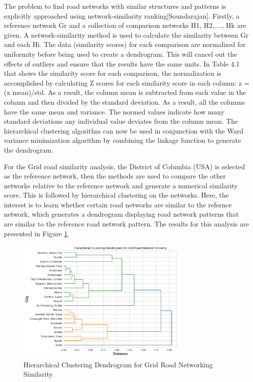 The problem to find road networks with similar structures and patterns is explicitly approached using network-similarity ranking[Soundarajan]. Firstly, a reference network Gr and a collection of comparison networks H1, H2,...., Hk are given. A network-similarity method is used to calculate the similarity between Gr and each Hi. The data (similarity scores) for each comparison are normalized for uniformity before being used to create a dendrogram. This will cancel out the effects of outliers and ensure that the results have the same units. In Table 4.1 that shows the similarity score for each comparison, the normalization is accomplished by calculating Z scores for each similarity score in each column: z = (x mean)/std. As a result, the column mean is subtracted from each value in the column and then divided by the standard deviation. As a result, all the columns have the same mean and variance. The normed values indicate how many standard deviations any individual value deviates from the column mean. The hierarchical clustering algorithm can now be used in conjunction with the Ward variance minimization algorithm by combining the linkage function to generate the dendrogram. 

For the Grid road similarity analysis, the District of Columbia (USA) is selected as the reference network, then the methods are used to compare the other networks relative to the reference network and generate a numerical similarity score. This is followed by hierarchical clustering on the networks. Here, the interest is to learn whether certain road networks are similar to the refernce network, which generates a dendrogram displaying road network patterns that are similar to the reference road network pattern. The results for this analysis are presented in Figure \ref{fig:Hierarchical Clustering Dendrogram for Grid Road Networking Similarity}.

\begin{figure}[!ht]
\centering
\includegraphics[width=0.75\textwidth,center]{picture/Grid/grid_dendrogram2.png}
\caption[Hierarchical Clustering Dendrogram for Grid Road Networking Similarity]{Hierarchical Clustering Dendrogram for Grid Road Networking Similarity}
\label{fig:Hierarchical Clustering Dendrogram for Grid Road Networking Similarity}
\end{figure}

